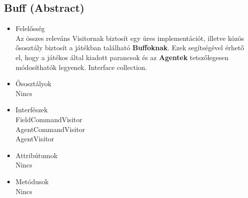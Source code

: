 \subsection{Buff (Abstract)}
\begin{itemize}

\item Felelősség\\
    Az összes releváns Visitornak biztosít egy üres implementációt, illetve közös ősosztály biztosít a játékban található \textbf{Buffoknak}. Ezek segítségével érhető el, hogy a játékos által kiadott parancsok és az \textbf{Agentek} tetszőlegesen módosíthatók legyenek. Interface collection.

\item Ősosztályok\\
Nincs

\item Interfészek\\
FieldCommandVisitor\\
AgentCommandVisitor\\
AgentVisitor\\

\item Attribútumok\\
Nincs

\item Metódusok\\
Nincs

\end{itemize}

